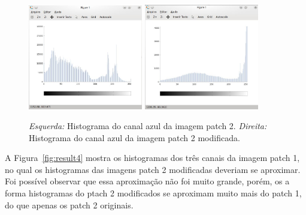 \begin{figure}[h]
    \centering
    \includegraphics[width=5cm]{histPatch2Blue.jpg}
    \includegraphics[width=5cm]{histFinalPatch2Bue.jpg}
    \caption{\emph{Esquerda:} Histograma do canal azul da imagem patch 2. \emph{Direita:} Histograma do canal azul da imagem patch 2 modificada.}
    \label{fig:result3}
\end{figure}

A Figura~\ref{fig:result4} mostra os histogramas dos três canais da imagem patch 1, no qual os histogramas das imagens patch 2 modificadas deveriam se aproximar. Foi possível observar que essa aproximação não foi muito grande, porém, os a forma histogramas do ptach 2 modificados se aproximam muito mais do patch 1, do que apenas os patch 2 originais.

